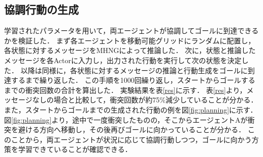 \documentclass[twocolumn,a4j]{jarticle}
\begin{document}
\subsection{協調行動の生成}
\label{3.3}
学習されたパラメータを用いて，両エージェントが協調してゴールに到達できるかを検証した．
まず各エージェントを移動可能グリッドにランダムに配置し，各状態に対するメッセージをMHNGによって推論した．
次に，状態と推論したメッセージを各Actorに入力し，出力された行動を実行して次の状態を決定した．
以降は同様に，各状態に対するメッセージの推論と行動生成をゴールに到達するまで繰り返した．
この手順を1000回繰り返し，スタートからゴールするまでの衝突回数の合計を算出した．
実験結果を表\ref{res}に示す．
表\ref{res}より，メッセージなしの場合と比較して，衝突回数が約75\%減少していることが分かる．
また，スタートからゴールまでの生成された行動の例を図\ref{fig:planning}に示す．
図\ref{fig:planning}より，途中で一度衝突したものの，そこからエージェントAが衝突を避ける方向へ移動し，その後再びゴールに向かっていることが分かる．
このことから，両エージェントが状況に応じて協調行動しつつ，ゴールに向かう方策を学習できていることが確認できる．

\begin{table}[t]
\caption{実験結果}
\label{res}
\centering
{}
\end{table} 

\end{document}

